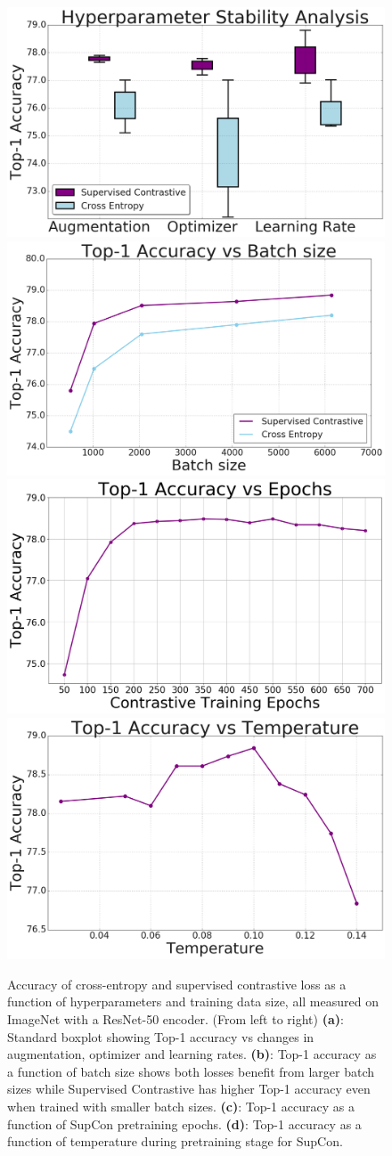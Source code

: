 \begin{figure}
    \centering
    \includegraphics[width=0.24\linewidth]{figs/stability.png}
    \includegraphics[width=0.24\linewidth]{figs/top1-vs-bs.png}
    \includegraphics[width=0.24\linewidth]{figs/epoch_sweep.png}
    \includegraphics[width=0.24\linewidth]{figs/temperature.png}
    \caption{Accuracy of cross-entropy and supervised contrastive loss as a function of hyperparameters and training data size, all measured on ImageNet with a ResNet-50 encoder. (From left to right)
    {\bf (a)}: Standard boxplot showing Top-1 accuracy vs changes in augmentation, optimizer and learning rates. 
    {\bf (b)}: Top-1 accuracy as a function of batch size shows both losses benefit from larger batch sizes while Supervised Contrastive has higher Top-1 accuracy even when trained with smaller batch sizes. 
    {\bf (c)}: Top-1 accuracy as a function of SupCon pretraining epochs.
     {\bf (d)}: Top-1 accuracy as a function of temperature during pretraining stage for SupCon. 
     }
    \label{fig:hparam_stability} 
\end{figure}





